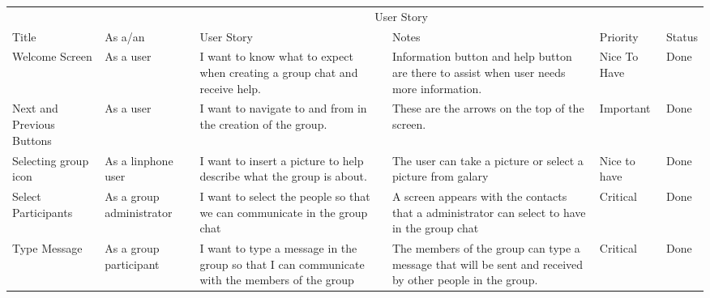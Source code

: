 \documentclass[a4paper]{article}
\begin{document}
\vspace{\baselineskip}
\begin{table} 
\begin{tabular}{p{1.5cm} p{2.5cm} p{3cm} p{3cm} p{1cm} p{1cm}} %
\hline %
& \multicolumn{5}{c}{User Story} \\ %
\cmidrule(l){2-6} %
Title & As a/an & User Story & Notes & Priority & Status\\ %
\hline %

Welcome Screen & As a user & I want to know what to expect when creating a group chat and receive help. & Information button and help button are there to assist when user needs more information. & Nice To Have & Done\\  \cmidrule(l){2-6}%

Next and Previous Buttons & As a user & I want to navigate to and from in the creation of the group. & These are the arrows on the top of the screen. & Important & Done\\  \cmidrule(l){2-6}%

Selecting group icon & As a linphone user & I want to insert a picture to help describe what the group is about.  & The user can take a picture or select a picture from galary & Nice to have & Done\\ %

Select Participants & As a group administrator & I want to select the people so that we can communicate in the group chat  & A screen appears with the contacts that a administrator can select to have in the group chat & Critical & Done\\ \cmidrule(l){2-6}%

Type Message & As a group participant & I want to type a message in the group so that I can communicate with the members of the group& The members of the group can type a message that will be sent and received by other people in the group. & Critical & Done\\ \cmidrule(l){2-6} %


\end{tabular}
\end{table}
\end{document}
